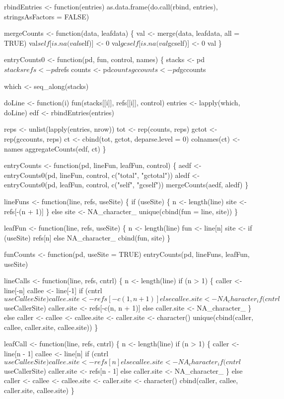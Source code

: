 \documentclass[11pt]{article}
\begin{document}
\begin{nwchunk}
 rbindEntries <- function(entries)
     as.data.frame(do.call(rbind, entries), stringsAsFactors = FALSE)
     
 mergeCounts <- function(data, leafdata) \{
     val <- merge(data, leafdata, all = TRUE)
     val$self[is.na(val$self)] <- 0
     val$gcself[is.na(val$gcself)] <- 0
     val
 \}
 
 entryCounts0 <- function(pd, fun, control, names) \{
     stacks <- pd$stacks
     refs <- pd$refs
     counts <- pd$counts
     gccounts <- pd$gccounts
 
     which <- seq_along(stacks)
     
     doLine <- function(i) fun(stacks[[i]], refs[[i]], control)
     entries <- lapply(which, doLine)
     edf <- rbindEntries(entries)
 
     reps <- unlist(lapply(entries, nrow))
     tot <- rep(counts, reps)
     gctot <- rep(gccounts, reps)
     ct <- cbind(tot, gctot, deparse.level = 0)
     colnames(ct) <- names
     aggregateCounts(edf, ct)
 \}
     
 entryCounts <- function(pd, lineFun, leafFun, control) \{
     aedf <- entryCounts0(pd, lineFun, control, c("total", "gctotal"))
     aledf <- entryCounts0(pd, leafFun, control, c("self", "gcself"))
     mergeCounts(aedf, aledf)
 \}
 
 lineFuns <- function(line, refs, useSite) \{
     if (useSite) \{
         n <- length(line)
         site <- refs[-(n + 1)]
     \}
     else site <- NA_character_
     unique(cbind(fun = line, site))
 \}
 
 leafFun <- function(line, refs, useSite) \{
     n <- length(line)
     fun <- line[n]
     site <- if (useSite) refs[n] else NA_character_
     cbind(fun, site)
 \}
 
 funCounts <- function(pd, useSite = TRUE)
     entryCounts(pd, lineFuns, leafFun, useSite)
     
 lineCalls <- function(line, refs, cntrl) \{
     n <- length(line)
     if (n > 1) \{
         caller <- line[-n]
         callee <- line[-1]
         if (cntrl$useCalleeSite)
             callee.site <- refs[-c(1, n + 1)]
         else
             callee.site <- NA_character_
         if (cntrl$useCallerSite)
             caller.site <- refs[-c(n, n + 1)]
         else
             caller.site <- NA_character_
     \}
     else
         caller <- callee <- callee.site <- caller.site <- character()
     unique(cbind(caller, callee, caller.site, callee.site))
 \}
 
 leafCall <- function(line, refs, cntrl) \{
     n <- length(line)
     if (n > 1) \{
         caller <- line[n - 1]
         callee <- line[n]
         if (cntrl$useCalleeSite)
             callee.site <- refs[n]
         else
             callee.site <- NA_character_
         if (cntrl$useCallerSite)
             caller.site <- refs[n - 1]
         else
             caller.site <- NA_character_
     \}
     else
         caller <- callee <- callee.site <- caller.site <- character()
     cbind(caller, callee, caller.site, callee.site)
 \}
 

\end{nwchunk}
\end{document}
